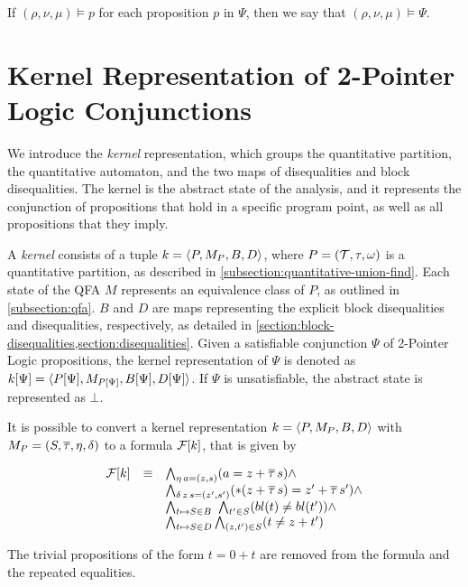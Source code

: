 If $(\rho, \nu, \mu)\models p$ for each proposition $p$ in $\Psi$, then we say that $(\rho, \nu, \mu) \models \Psi$.





\section{Kernel Representation of 2-Pointer Logic Conjunctions}

We introduce the \emph{kernel} representation, which groups the quantitative partition, the quantitative automaton, and the two maps of disequalities and block disequalities.
The kernel is the abstract state of the analysis, and it represents the conjunction of propositions that hold in a specific program point, as well as all propositions that they imply.

A \emph{kernel} consists of a tuple $k = \langle P,M_P,B,D\rangle$, where $P = (\mathcal{T}, \tau, \omega)$ is a quantitative partition, as described in \cref{subsection:quantitative-union-find}.
Each state of the QFA $M$ represents an equivalence class of $P$, as outlined in \cref{subsection:qfa}.
$B$ and $D$ are maps representing the explicit block disequalities and disequalities, respectively, as detailed in \cref{section:block-disequalities,section:disequalities}.
Given a satisfiable conjunction $\Psi$ of 2-Pointer Logic propositions, the kernel representation of $\Psi$ is denoted as $k[\Psi] = \langle P[\Psi],M_{P[\Psi]},B[\Psi],D[\Psi]\rangle$.
If $\Psi$ is unsatisfiable, the abstract state is represented as $\bot$.

It is possible to convert a kernel representation $k = \langle P,M_P,B,D\rangle$ with $M_P = (S, \overline{\tau}, \eta, \delta)$ to a formula $\mathcal{F}[k]$, that is given by

\[
  \begin{array}{lll}
    \F[k] & \equiv & \bigwedge_{\eta\,a=(z,s)} (a = z + \otau\,s) \land                            \\
          &        & \bigwedge_{\delta\,z\,s=(z',s')} (*(z + \otau\,s) = z' + \otau\,s') \land     \\
          &        & \bigwedge_{t \mapsto S \in B}  \bigwedge_{t' \in S} (bl(t) \neq bl(t')) \land \\
          &        & \bigwedge_{t \mapsto S \in D} \bigwedge_{(z, t') \in S}(t \neq z + t')
  \end{array}
\]

The trivial propositions of the form $t = 0 + t$ are removed from the formula and the repeated equalities.


